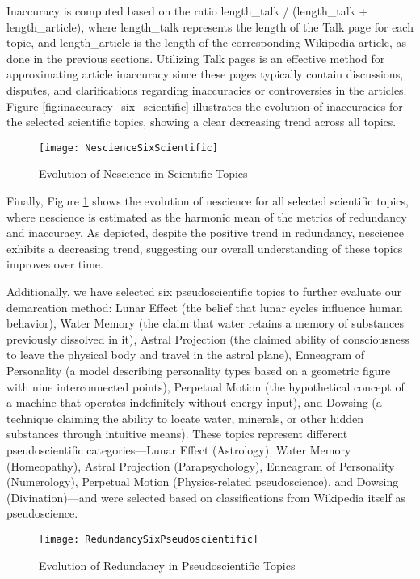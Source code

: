 Inaccuracy is computed based on the ratio length\_talk / (length\_talk + length\_article), where length\_talk represents the length of the Talk page for each topic, and length\_article is the length of the corresponding Wikipedia article, as done in the previous sections. Utilizing Talk pages is an effective method for approximating article inaccuracy since these pages typically contain discussions, disputes, and clarifications regarding inaccuracies or controversies in the articles. Figure \ref{fig:inaccuracy_six_scientific} illustrates the evolution of inaccuracies for the selected scientific topics, showing a clear decreasing trend across all topics.

\begin{figure}[H]
\centering\texttt{[image: NescienceSixScientific]}
\caption{\label{fig:nescience_six_scientific}Evolution of Nescience in Scientific Topics}
\end{figure}

Finally, Figure \ref{fig:nescience_six_scientific} shows the evolution of nescience for all selected scientific topics, where nescience is estimated as the harmonic mean of the metrics of redundancy and inaccuracy. As depicted, despite the positive trend in redundancy, nescience exhibits a decreasing trend, suggesting our overall understanding of these topics improves over time.

Additionally, we have selected six pseudoscientific topics to further evaluate our demarcation method: Lunar Effect (the belief that lunar cycles influence human behavior), Water Memory (the claim that water retains a memory of substances previously dissolved in it), Astral Projection (the claimed ability of consciousness to leave the physical body and travel in the astral plane), Enneagram of Personality (a model describing personality types based on a geometric figure with nine interconnected points), Perpetual Motion (the hypothetical concept of a machine that operates indefinitely without energy input), and Dowsing (a technique claiming the ability to locate water, minerals, or other hidden substances through intuitive means). These topics represent different pseudoscientific categories—Lunar Effect (Astrology), Water Memory (Homeopathy), Astral Projection (Parapsychology), Enneagram of Personality (Numerology), Perpetual Motion (Physics-related pseudoscience), and Dowsing (Divination)—and were selected based on classifications from Wikipedia itself as pseudoscience.

\begin{figure}[H]
\centering\texttt{[image: RedundancySixPseudoscientific]}
\caption{\label{fig:redundancy_six_pseudoscientific}Evolution of Redundancy in Pseudoscientific Topics}
\end{figure}

